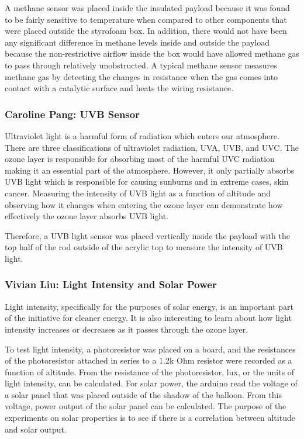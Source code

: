 \documentclass[12pt,]{article}
\begin{document}
A methane sensor was placed inside the insulated payload because it was
found to be fairly sensitive to temperature when compared to other
components that were placed outside the styrofoam box. In addition,
there would not have been any significant difference in methane levels
inside and outside the payload because the non-restrictive airflow
inside the box would have allowed methane gas to pass through relatively
unobstructed. A typical methane sensor measures methane gas by detecting
the changes in resistance when the gas comes into contact with a
catalytic surface and heats the wiring resistance.

\subsubsection{Caroline Pang: UVB
Sensor}\label{caroline-pang-uvb-sensor}

Ultraviolet light is a harmful form of radiation which enters our
atmosphere. There are three classifications of ultraviolet radiation,
UVA, UVB, and UVC. The ozone layer is responsible for absorbing most of
the harmful UVC radiation making it an essential part of the atmosphere.
However, it only partially absorbs UVB light which is responsible for
causing sunburns and in extreme cases, skin cancer. Measuring the
intensity of UVB light as a function of altitude and observing how it
changes when entering the ozone layer can demonstrate how effectively
the ozone layer absorbs UVB light.

Therefore, a UVB light sensor was placed vertically inside the payload
with the top half of the rod outside of the acrylic top to measure the
intensity of UVB light.

\subsubsection{Vivian Liu: Light Intensity and Solar
Power}\label{vivian-liu-light-intensity-and-solar-power}

Light intensity, specifically for the purposes of solar energy, is an
important part of the initiative for cleaner energy. It is also
interesting to learn about how light intensity increases or decreases as
it passes through the ozone layer.

To test light intensity, a photoresistor was placed on a board, and the
resistances of the photoresistor attached in series to a 1.2k Ohm
resistor were recorded as a function of altitude. From the resistance of
the photoresistor, lux, or the units of light intensity, can be
calculated. For solar power, the arduino read the voltage of a solar
panel that was placed outside of the shadow of the balloon. From this
voltage, power output of the solar panel can be calculated. The purpose
of the experiments on solar properties is to see if there is a
correlation between altitude and solar output.
\end{document}
